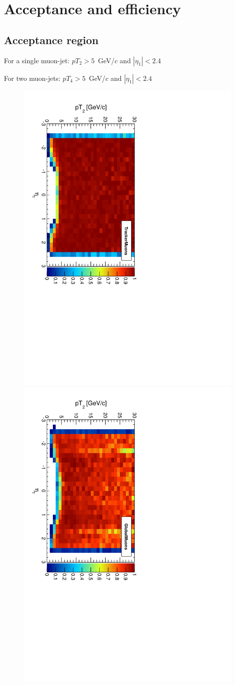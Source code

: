 \documentclass[12pt]{article}
\begin{document}
\clearpage
\section{Acceptance and efficiency}

\subsection{Acceptance region}

For a single muon-jet: $pT_2 > 5$~GeV/$c$ and $|\eta_1| < 2.4$

For two muon-jets: $pT_4 > 5$~GeV/$c$ and $|\eta_1| < 2.4$

\begin{figure}[p]
\includegraphics[height=0.5\linewidth, angle=90]{fig/acceptance_plot/pt2vseta1_TrackerMuons.pdf}
\includegraphics[height=0.5\linewidth, angle=90]{fig/acceptance_plot/pt2vseta1_GlobalMuons.pdf}


\end{figure}
\end{document}
